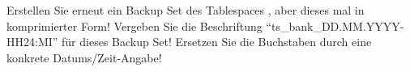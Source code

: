     \item Erstellen Sie erneut ein Backup Set des Tablespaces ,
    aber dieses mal in komprimierter Form! Vergeben Sie die Beschriftung
    \enquote{ts\_bank\_DD.MM.YYYY-HH24:MI} für dieses Backup Set! Ersetzen Sie
    die Buchstaben durch eine konkrete Datums/Zeit-Angabe!
